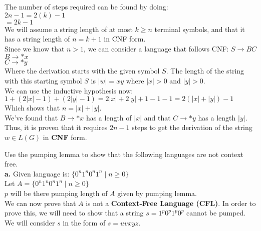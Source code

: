 \documentclass[12pt]{article}
\begin{document}
The number of steps required can be found by doing: \\
$2n - 1 = 2(k) - 1$ \\
$       = 2k - 1 $ \\

We will assume a string length of at most $k \geq n$ terminal symbols, and that it has a string
length of $n = k + 1$ in CNF form. \\

Since we know that $n > 1$, we can consider a language that follows CNF:
$S \rightarrow BC$ \\
$B \rightarrow *x$ \\
$C \rightarrow *y$ \\

Where the derivation starts with the given symbol $S$. The length of the string with
this starting symbol $S$ is $|w| = xy$ where $|x| > 0$ and $|y| > 0$. \\

We can use the inductive hypothesis now: \\

$1 + (2 |x| - 1) + (2 |y| - 1) = 2|x| + 2|y| + 1 - 1 - 1 = 2 (|x| + |y|) - 1 $ \\

Which shows that $n = |x| + |y|$. \\

We've found that $B \rightarrow *x$ has a length of $|x|$ and that $C \rightarrow *y$
has a length $|y|$. Thus, it is proven that it requires $2n - 1$ steps to get the
derivation of the string $w \in L(G)$ in \textbf{CNF} form.

 Use the pumping lemma to show that the following languages are not context free. \\

\textbf{a.} Given language is: $ \{0^n 1^n 0^n 1^n \; | \; n \geq 0 \} $ \\

Let $A = \{0^n 1^n 0^n 1^n \; | \; n \geq 0 \} $ \\
$p$ will be there pumping length of $A$ given by pumping lemma. \\

We can now prove that $A$ is not a \textbf{Context-Free Language (CFL)}.
In order to prove this, we will need to show that a string $s = 1^p 0^p 1^p 0^p$
cannot be pumped. We will consider $s$ in the form of $s = uvxyz$. \\
\end{document}
